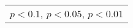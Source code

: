\begin{tabular}{l|cccccc|cc|cc}
\multicolumn{11}{l}{\tiny \sym{*} \(p<0.1\), \sym{**} \(p<0.05\), \sym{***} \(p<0.01\)}\\
\end{tabular}